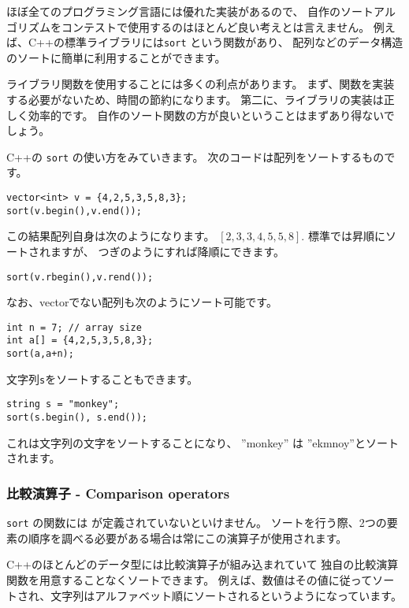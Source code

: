 
ほぼ全てのプログラミング言語には優れた実装があるので、
自作のソートアルゴリズムをコンテストで使用するのはほとんど良い考えとは言えません。
例えば、C++の標準ライブラリには\texttt{sort} という関数があり、
配列などのデータ構造のソートに簡単に利用することができます。

ライブラリ関数を使用することには多くの利点があります。
まず、関数を実装する必要がないため、時間の節約になります。
第二に、ライブラリの実装は正しく効率的です。
自作のソート関数の方が良いということはまずあり得ないでしょう。

C++の \texttt{sort} の使い方をみていきます。
次のコードは配列をソートするものです。
\begin{lstlisting}
vector<int> v = {4,2,5,3,5,8,3};
sort(v.begin(),v.end());
\end{lstlisting}
この結果配列自身は次のようになります。
$[2,3,3,4,5,5,8]$.
標準では昇順にソートされますが、
つぎのようにすれば降順にできます。
\begin{lstlisting}
sort(v.rbegin(),v.rend());
\end{lstlisting}
なお、vectorでない配列も次のようにソート可能です。
\begin{lstlisting}
int n = 7; // array size
int a[] = {4,2,5,3,5,8,3};
sort(a,a+n);
\end{lstlisting}
\newpage
文字列\texttt{s}をソートすることもできます。
\begin{lstlisting}
string s = "monkey";
sort(s.begin(), s.end());
\end{lstlisting}
これは文字列の文字をソートすることになり、
''monkey'' は ''ekmnoy''とソートされます。

\subsubsection{比較演算子 - Comparison operators}


\texttt{sort} の関数には
が定義されていないといけません。
ソートを行う際、2つの要素の順序を調べる必要がある場合は常にこの演算子が使用されます。

C++のほとんどのデータ型には比較演算子が組み込まれていて
独自の比較演算関数を用意することなくソートできます。
例えば、数値はその値に従ってソートされ、文字列はアルファベット順にソートされるというようになっています。


